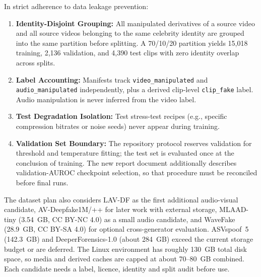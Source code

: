 \documentclass[conference]{IEEEtran}
\begin{document}
In strict adherence to data leakage prevention:
\begin{enumerate}
    \item \textbf{Identity-Disjoint Grouping:} All manipulated derivatives of a source video and all source videos belonging to the same celebrity identity are grouped into the same partition before splitting. A 70/10/20 partition yields 15,018 training, 2,136 validation, and 4,390 test clips with zero identity overlap across splits.
    \item \textbf{Label Accounting:} Manifests track \texttt{video\_\allowbreak manipulated} and \texttt{audio\_\allowbreak manipulated} independently, plus a derived clip-level \texttt{clip\_\allowbreak fake} label. Audio manipulation is never inferred from the video label.
    \item \textbf{Test Degradation Isolation:} Test stress-test recipes (e.g., specific compression bitrates or noise seeds) never appear during training.
    \item \textbf{Validation Set Boundary:} The repository protocol reserves validation for threshold and temperature fitting; the test set is evaluated once at the conclusion of training. The new report document additionally describes validation-AUROC checkpoint selection, so that procedure must be reconciled before final runs.
\end{enumerate}

The dataset plan also considers LAV-DF as the first additional audio-visual candidate, AV-Deepfake1M/++ for later work with external storage, MLAAD-tiny (3.54~GB, CC BY-NC 4.0) as a small audio candidate, and WaveFake (28.9~GB, CC BY-SA 4.0) for optional cross-generator evaluation. ASVspoof~5 (142.3~GB) and DeeperForensics-1.0 (about 284~GB) exceed the current storage budget or are deferred. The Linux environment has roughly 130~GB total disk space, so media and derived caches are capped at about 70--80~GB combined. Each candidate needs a label, licence, identity and split audit before use.
\end{document}
